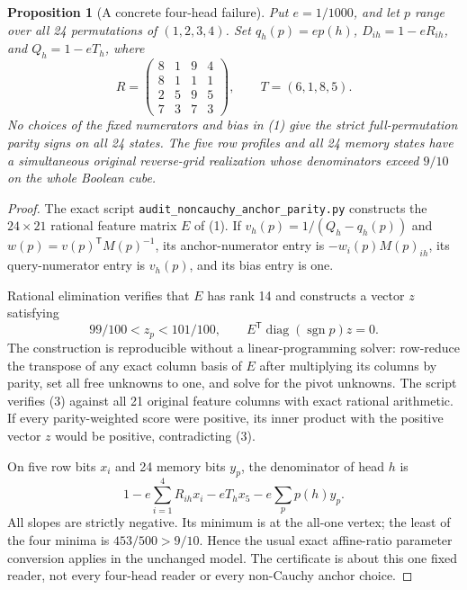 \documentclass[11pt]{article}
\newtheorem{proposition}{Proposition}
\begin{document}
\begin{proposition}[A concrete four-head failure]
Put $e=1/1000$, and let $p$ range over all 24 permutations of
$(1,2,3,4)$. Set $q_h(p)=ep(h)$,
$D_{ih}=1-eR_{ih}$, and $Q_h=1-eT_h$, where
\[
 R=\begin{pmatrix}8&1&9&4\\8&1&1&1\\2&5&9&5\\7&3&7&3\end{pmatrix},
 \qquad T=(6,1,8,5).
 \tag{2}
\]
No choices of the fixed numerators and bias in (1) give the strict
full-permutation parity signs on all 24 states.
The five row profiles and all 24 memory states have a simultaneous
original reverse-grid realization whose denominators exceed $9/10$
on the whole Boolean cube.
\end{proposition}
\begin{proof}
The exact script \texttt{audit\_noncauchy\_anchor\_parity.py} constructs
the $24\times21$ rational feature matrix $E$ of (1). If
$v_h(p)=1/(Q_h-q_h(p))$ and $w(p)=v(p)^{\mathsf T}M(p)^{-1}$,
its anchor-numerator entry is $-w_i(p)M(p)_{ih}$, its query-numerator
entry is $v_h(p)$, and its bias entry is one.

Rational elimination verifies that $E$ has rank 14 and constructs
a vector $z$ satisfying
\[
 99/100<z_p<101/100,\qquad
 E^{\mathsf T}\operatorname{diag}(\operatorname{sgn}p)z=0.
 \tag{3}
\]
The construction is reproducible without a linear-programming
solver: row-reduce the transpose of any exact column basis of $E$
after multiplying its columns by parity, set all free unknowns to
one, and solve for the pivot unknowns. The script verifies (3)
against all 21 original feature columns with exact rational arithmetic.
If every parity-weighted score were positive, its inner product with
the positive vector $z$ would be positive, contradicting (3).

On five row bits $x_i$ and 24 memory bits $y_p$, the denominator
of head $h$ is
\[
 1-e\sum_{i=1}^4R_{ih}x_i-eT_hx_5-e\sum_p p(h)y_p.
\]
All slopes are strictly negative. Its minimum is at the all-one
vertex; the least of the four minima is $453/500>9/10$. Hence the
usual exact affine-ratio parameter conversion applies in the unchanged
model. The certificate is about this one fixed reader, not every
four-head reader or every non-Cauchy anchor choice.
\end{proof}
\end{document}
